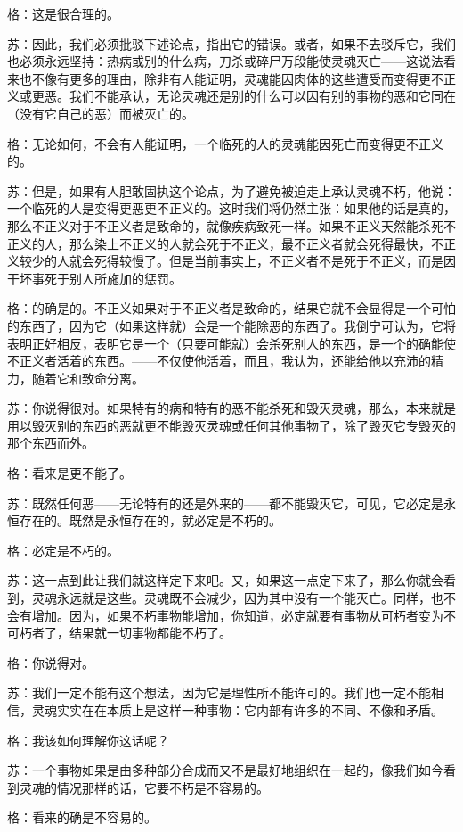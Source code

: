 \documentclass[12pt,oneside]{book}
\begin{document}
格：这是很合理的。

苏：因此，我们必须批驳下述论点，指出它的错误。或者，如果不去驳斥它，我们也必须永远坚持：热病或别的什么病，刀杀或碎尸万段能使灵魂灭亡——这说法看来也不像有更多的理由，除非有人能证明，灵魂能因肉体的这些遭受而变得更不正义或更恶。我们不能承认，无论灵魂还是别的什么可以因有别的事物的恶和它同在（没有它自己的恶）而被灭亡的。

格：无论如何，不会有人能证明，一个临死的人的灵魂能因死亡而变得更不正义的。

苏：但是，如果有人胆敢固执这个论点，为了避免被迫走上承认灵魂不朽，他说：一个临死的人是变得更恶更不正义的。这时我们将仍然主张：如果他的话是真的，那么不正义对于不正义者是致命的，就像疾病致死一样。如果不正义天然能杀死不正义的人，那么染上不正义的人就会死于不正义，最不正义者就会死得最快，不正义较少的人就会死得较慢了。但是当前事实上，不正义者不是死于不正义，而是因干坏事死于别人所施加的惩罚。

格：的确是的。不正义如果对于不正义者是致命的，结果它就不会显得是一个可怕的东西了，因为它（如果这样就）会是一个能除恶的东西了。我倒宁可认为，它将表明正好相反，表明它是一个（只要可能就）会杀死别人的东西，是一个的确能使不正义者活着的东西。——不仅使他活着，而且，我认为，还能给他以充沛的精力，随着它和致命分离。

苏：你说得很对。如果特有的病和特有的恶不能杀死和毁灭灵魂，那么，本来就是用以毁灭别的东西的恶就更不能毁灭灵魂或任何其他事物了，除了毁灭它专毁灭的那个东西而外。

格：看来是更不能了。

苏：既然任何恶——无论特有的还是外来的——都不能毁灭它，可见，它必定是永恒存在的。既然是永恒存在的，就必定是不朽的。

格：必定是不朽的。

苏：这一点到此让我们就这样定下来吧。又，如果这一点定下来了，那么你就会看到，灵魂永远就是这些。灵魂既不会减少，因为其中没有一个能灭亡。同样，也不会有增加。因为，如果不朽事物能增加，你知道，必定就要有事物从可朽者变为不可朽者了，结果就一切事物都能不朽了。

格：你说得对。

苏：我们一定不能有这个想法，因为它是理性所不能许可的。我们也一定不能相信，灵魂实实在在本质上是这样一种事物：它内部有许多的不同、不像和矛盾。

格：我该如何理解你这话呢？

苏：一个事物如果是由多种部分合成而又不是最好地组织在一起的，像我们如今看到灵魂的情况那样的话，它要不朽是不容易的。

格：看来的确是不容易的。
\end{document}
